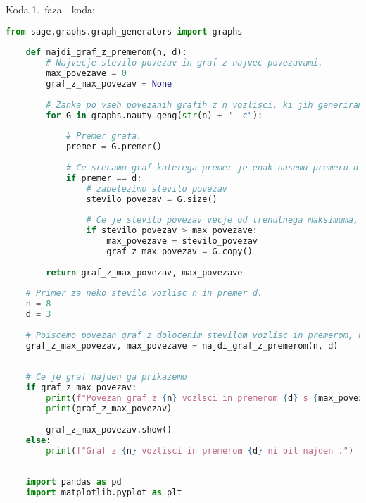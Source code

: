 \documentclass[12pt,a4paper]{amsart}
\makeatletter
\renewcommand\section{\@startsection{section}{1}%
  \z@{.5\linespacing\@plus.7\linespacing}{.5\linespacing}%
  {\normalfont\scshape\large\centering}}
\renewcommand\subsection{\@startsection{subsection}{2}%
  \z@{.5\linespacing\@plus.7\linespacing}{.5\linespacing}%
  {\normalfont\scshape}}
\theoremstyle{definition} %
\theoremstyle{plain} %
\makeatother
\begin{document}
\section{Koda}
\vspace{10pt}
\subsection{1.\ faza - koda:}
\vspace{10pt}

\begin{lstlisting}[language=Python]
    from sage.graphs.graph_generators import graphs
    
    def najdi_graf_z_premerom(n, d):
        # Najvecje stevilo povezav in graf z najvec povezavami.
        max_povezave = 0
        graf_z_max_povezav = None
        
        # Zanka po vseh povezanih grafih z n vozlisci, ki jih generiramo z uporabo nauty_geng().
        for G in graphs.nauty_geng(str(n) + " -c"):
            
            # Premer grafa.
            premer = G.premer()
            
            # Ce srecamo graf katerega premer je enak nasemu premeru d
            if premer == d:
                # zabelezimo stevilo povezav
                stevilo_povezav = G.size()
                
                # Ce je stevilo povezav vecje od trenutnega maksimuma, posodobi maksimum.
                if stevilo_povezav > max_povezave:
                    max_povezave = stevilo_povezav
                    graf_z_max_povezav = G.copy()  
        
        return graf_z_max_povezav, max_povezave
    
    # Primer za neko stevilo vozlisc n in premer d.
    n = 8
    d = 3
    
    # Poiscemo povezan graf z dolocenim stevilom vozlisc in premerom, ki bo imel maksimalno stevilo povezav.
    graf_z_max_povezav, max_povezave = najdi_graf_z_premerom(n, d)
    
    
    # Ce je graf najden ga prikazemo
    if graf_z_max_povezav:
        print(f"Povezan graf z {n} vozlsci in premerom {d} s {max_povezave} povezavami:")
        print(graf_z_max_povezav)
        
        graf_z_max_povezav.show()
    else:
        print(f"Graf z {n} vozlisci in premerom {d} ni bil najden .")
    
    
    import pandas as pd
    import matplotlib.pyplot as plt
    

\end{lstlisting}
\end{document}
